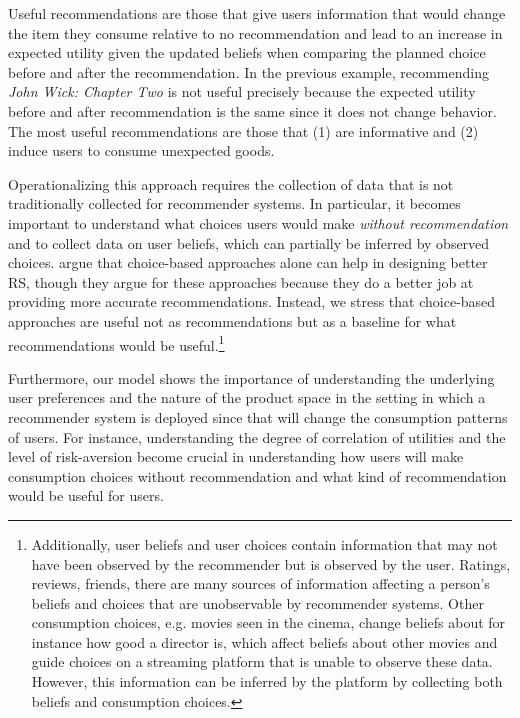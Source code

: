 \documentclass[sigconf, anonymous, review]{acmart}
\begin{document}
Useful recommendations are those that give users information that would change the item they consume relative to no recommendation and lead to an increase in expected utility given the updated beliefs when comparing the planned choice before and after the recommendation. In the previous example, recommending \textit{John Wick: Chapter Two} is not useful precisely because the expected utility before and after recommendation is the same since it does not change behavior. The most useful recommendations are those that (1) are informative and (2) induce users to consume unexpected goods.
\par

Operationalizing this approach requires the collection of data that is not traditionally collected for recommender systems. In particular, it becomes important to understand what choices users would make \textit{without recommendation} and to collect data on user beliefs, which can partially be inferred by observed choices. \cite{jiang2014choice, saavedra2016choice} argue that choice-based approaches alone can help in designing better RS, though they argue for these approaches because they do a better job at providing more accurate recommendations. Instead, we stress that choice-based approaches are useful not as recommendations but as a baseline for what recommendations would be useful.\footnote{Additionally, user beliefs and user choices contain information that may not have been observed by the recommender but is observed by the user. Ratings, reviews, friends, there are many sources of information affecting a person's beliefs and choices that are unobservable by recommender systems. Other consumption choices, e.g. movies seen in the cinema, change beliefs about for instance how good a director is, which affect beliefs about other movies and guide choices on a streaming platform that is unable to observe these data. However, this information can be inferred by the platform by collecting both beliefs and consumption choices.}
\par

Furthermore, our model shows the importance of understanding the underlying user preferences and the nature of the product space in the setting in which a recommender system is deployed since that will change the consumption patterns of users. For instance, understanding the degree of correlation of utilities and the level of risk-aversion become crucial in understanding how users will make consumption choices without recommendation and what kind of recommendation would be useful for users.
\par
\end{document}
